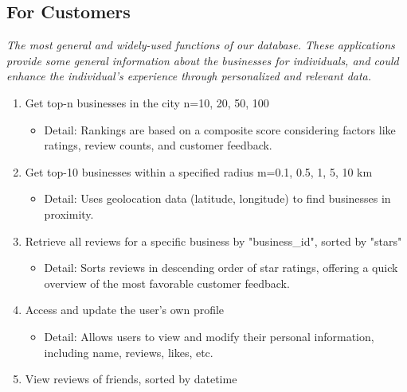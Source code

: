 \documentclass[runningheads]{llncs}
\begin{document}
\subsection{For Customers}

\textit{The most general and widely-used functions of our database. These applications provide some general information about the businesses for individuals, and could enhance the individual's experience through personalized and relevant data.}


\begin{enumerate}

    \item Get top-n businesses in the city n=10, 20, 50, 100

    \begin{itemize}
        \item[\textbullet] Detail: Rankings are based on a composite score considering factors like ratings, review counts, and customer feedback.
    \end{itemize}
    
    \item Get top-10 businesses within a specified radius m=0.1, 0.5, 1, 5, 10 km

    \begin{itemize}
        \item[\textbullet] Detail: Uses geolocation data (latitude, longitude) to find businesses in proximity.
    \end{itemize}


    \item Retrieve all reviews for a specific business by "business\_id", sorted by "stars"

   \begin{itemize}
        \item[\textbullet] Detail: Sorts reviews in descending order of star ratings, offering a quick overview of the most favorable customer feedback.
    \end{itemize}
    

    \item Access and update the user's own profile
    
    \begin{itemize}
        \item[\textbullet] Detail: Allows users to view and modify their personal information, including name, reviews, likes, etc.
    \end{itemize}

    \item View reviews of friends, sorted by datetime
    

\end{enumerate}
\end{document}
